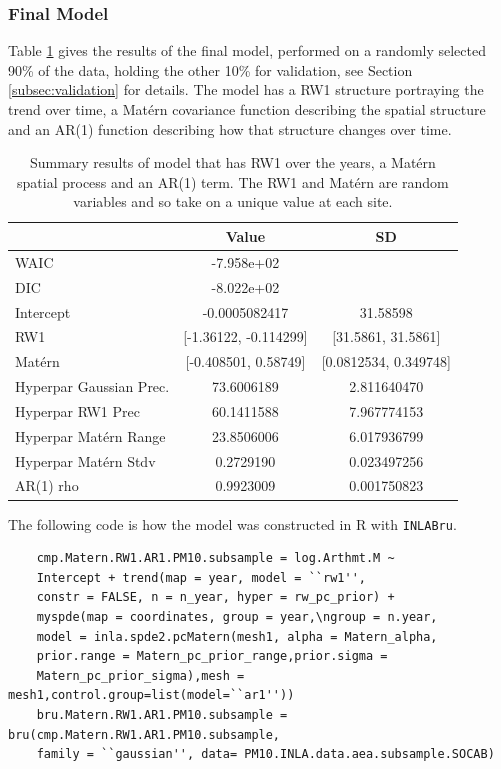 \subsubsection*{Final Model} \label{seq:finalModel}

Table \ref{tab:model_INLA_full} gives the results of the final model, performed on a randomly selected 90\% of the data, holding the other 10\% for validation, see Section \ref{subsec:validation} for details.  The model has a \ac{RW}1 structure portraying the trend over time, a Mat\'{e}rn covariance function describing the spatial structure and an \ac{AR}(1) function describing how that structure changes over time.

\begin{table}[ht]
	\centering
	\begin{tabular}{l|c|c}
		& Value & SD  \\
		\hline
		WAIC & -7.958e+02   & \\
		DIC & -8.022e+02 & \\
		Intercept & -0.0005082417 & 31.58598  \\
		RW1 & [-1.36122, -0.114299] & [31.5861, 31.5861] \\
		Mat\'{e}rn & [-0.408501, 0.58749] & [0.0812534, 0.349748] \\
		Hyperpar Gaussian Prec. & 73.6006189  &  2.811640470 \\
		Hyperpar RW1 Prec & 60.1411588 & 7.967774153 \\ 
		Hyperpar Mat\'{e}rn Range & 23.8506006 & 6.017936799 \\
		Hyperpar Mat\'{e}rn Stdv & 0.2729190 & 0.023497256 \\
		AR(1) rho & 0.9923009 & 0.001750823 
	\end{tabular}
	\caption{Summary results of model that has RW1 over the years, a Mat\'{e}rn spatial process and an AR(1) term.   The RW1 and Mat\'{e}rn are random variables and so take on a unique value at each site. }
	\label{tab:model_INLA_full}
\end{table}

The following code is how the model was constructed in R with \lstinline{INLABru}.
\begin{lstlisting}
	cmp.Matern.RW1.AR1.PM10.subsample = log.Arthmt.M ~ 
	Intercept + trend(map = year, model = ``rw1'', 
	constr = FALSE, n = n_year, hyper = rw_pc_prior) +
	myspde(map = coordinates, group = year,\ngroup = n.year,
	model = inla.spde2.pcMatern(mesh1, alpha = Matern_alpha,
	prior.range = Matern_pc_prior_range,prior.sigma = 
	Matern_pc_prior_sigma),mesh = mesh1,control.group=list(model=``ar1''))
	bru.Matern.RW1.AR1.PM10.subsample = bru(cmp.Matern.RW1.AR1.PM10.subsample,             
	family = ``gaussian'', data= PM10.INLA.data.aea.subsample.SOCAB)
\end{lstlisting}


